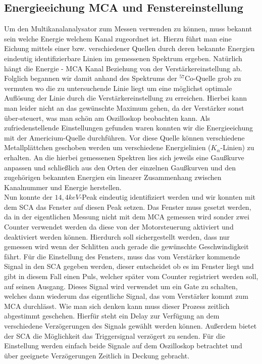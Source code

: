 \documentclass[12pt]{article}
\begin{document}
\subsection{Energieeichung MCA und Fenstereinstellung}
Um den Multikanalanalysator zum Messen verwenden zu können, muss bekannt sein welche Energie welchem Kanal zugeordnet ist. Hierzu führt man eine Eichung mittels einer bzw. verschiedener
Quellen durch deren bekannte Energien eindeutig identifizierbare Linien im gemessenen Spektrum ergeben. Natürlich hängt die Energie - MCA Kanal Beziehung von der Verstärkereinstellung ab.
Folglich begannen wir damit anhand des Spektrums der $^{57}$Co-Quelle grob zu vermuten wo die zu untersuchende Linie liegt um eine möglichst optimale Auflösung der Linie durch die
Verstärkereinstellung zu erreichen. Hierbei kann man leider nicht an das gewünschte Maximum gehen, da der Verstärker sonst über-steuert, was man schön am Oszilloskop beobachten kann.
Als zufriedenstellende Einstellungen gefunden waren konnten wir die Energieeichung mit der Americium-Quelle durchführen. Vor diese Quelle können verschiedene Metallplättchen geschoben
werden um verschiedene Energielinien ($K_\alpha$-Linien) zu erhalten. An die hierbei gemessenen Spektren lies sich jeweils eine Gaußkurve anpassen und schließlich aus den Orten der
einzelnen Gaußkurven und den zugehörigen bekannten Energien ein linearer Zusammenhang zwischen Kanalnummer und Energie herstellen.\\

Nun konnte der $14,4keV$-Peak eindeutig identifiziert werden und wir konnten mit dem SCA das Fenster auf diesen Peak setzen. Das Fenster muss gesetzt werden, da in der eigentlichen
Messung nicht mit dem MCA gemessen wird sonder zwei Counter verwendet werden da diese von der Motorsteuerung aktiviert und deaktiviert werden können. Hierdurch soll sichergestellt werden,
dass nur gemessen wird wenn der Schlitten auch gerade die gewünschte Geschwindigkeit fährt. Für die Einstellung des Fensters, muss das vom Verstärker kommende Signal in den SCA gegeben
werden, dieser entscheidet ob es im Fenster liegt und gibt in diesem Fall einen Puls, welcher später vom Counter registriert werden soll, auf seinen Ausgang. Dieses Signal wird verwendet
um ein Gate zu schalten, welches dann wiederum das eigentliche Signal, das vom Verstärker kommt zum MCA durchlässt. Wie man sich denken kann muss dieser Prozess zeitlich abgestimmt
geschehen. Hierfür steht ein Delay zur Verfügung an dem verschiedene Verzögerungen des Signals gewählt werden können. Außerdem bietet der SCA die Möglichkeit das Triggersignal verzögert
zu senden. Für die Einstellung werden einfach beide Signale auf dem Oszilloskop betrachtet und über geeignete Verzögerungen Zeitlich in Deckung gebracht.\\
\end{document}

